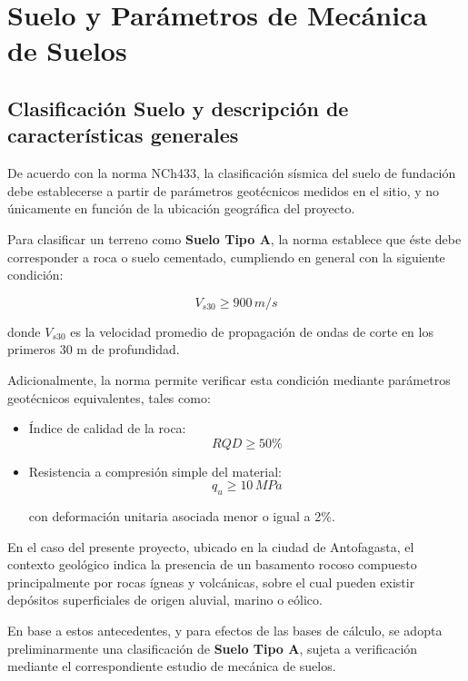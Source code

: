\section{Suelo y Parámetros de Mecánica de Suelos}

\subsection{Clasificación Suelo y descripción de características generales}

De acuerdo con la norma NCh433, la clasificación sísmica del suelo de fundación debe establecerse a partir de parámetros geotécnicos medidos en el sitio, y no únicamente en función de la ubicación geográfica del proyecto.

Para clasificar un terreno como \textbf{Suelo Tipo A}, la norma establece que éste debe corresponder a roca o suelo cementado, cumpliendo en general con la siguiente condición:

\begin{equation}
V_{s30} \geq 900 \, m/s
\end{equation}

donde $V_{s30}$ es la velocidad promedio de propagación de ondas de corte en los primeros 30 m de profundidad.

Adicionalmente, la norma permite verificar esta condición mediante parámetros geotécnicos equivalentes, tales como:

\begin{itemize}
    \item Índice de calidad de la roca:
    \begin{equation}
    RQD \geq 50\%
    \end{equation}

    \item Resistencia a compresión simple del material:
    \begin{equation}
    q_u \geq 10 \, MPa
    \end{equation}

    con deformación unitaria asociada menor o igual a 2\%.
\end{itemize}

En el caso del presente proyecto, ubicado en la ciudad de Antofagasta, el contexto geológico indica la presencia de un basamento rocoso compuesto principalmente por rocas ígneas y volcánicas, sobre el cual pueden existir depósitos superficiales de origen aluvial, marino o eólico.

En base a estos antecedentes, y para efectos de las bases de cálculo, se adopta preliminarmente una clasificación de \textbf{Suelo Tipo A}, sujeta a verificación mediante el correspondiente estudio de mecánica de suelos.

